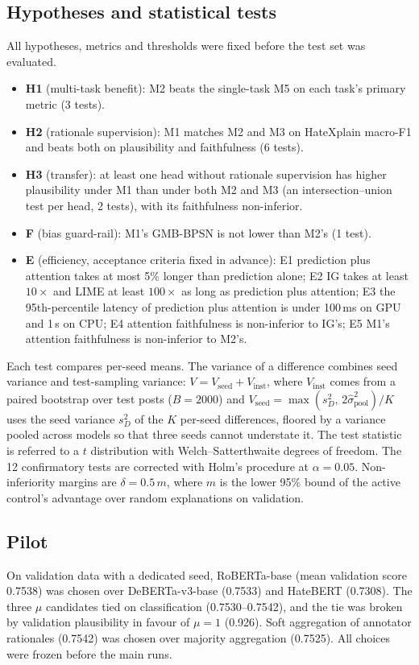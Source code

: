 \documentclass[preprint,12pt,authoryear]{elsarticle}
\begin{document}
\subsection{Hypotheses and statistical tests}
All hypotheses, metrics and thresholds were fixed before the test set was evaluated.
\begin{itemize}
\item \textbf{H1} (multi-task benefit): M2 beats the single-task M5 on each task's primary metric (3 tests).
\item \textbf{H2} (rationale supervision): M1 matches M2 and M3 on HateXplain macro-F1 and beats both on plausibility and faithfulness (6 tests).
\item \textbf{H3} (transfer): at least one head without rationale supervision has higher plausibility under M1 than under both M2 and M3 (an intersection--union test per head, 2 tests), with its faithfulness non-inferior.
\item \textbf{F} (bias guard-rail): M1's GMB-BPSN is not lower than M2's (1 test).
\item \textbf{E} (efficiency, acceptance criteria fixed in advance): E1 prediction plus attention takes at most 5\% longer than prediction alone; E2 IG takes at least $10\times$ and LIME at least $100\times$ as long as prediction plus attention; E3 the 95th-percentile latency of prediction plus attention is under 100\,ms on GPU and 1\,s on CPU; E4 attention faithfulness is non-inferior to IG's; E5 M1's attention faithfulness is non-inferior to M2's.
\end{itemize}
Each test compares per-seed means. The variance of a difference combines seed variance and test-sampling variance: $V = V_{\text{seed}} + V_{\text{inst}}$, where $V_{\text{inst}}$ comes from a paired bootstrap over test posts ($B=2000$) and $V_{\text{seed}} = \max(s_D^2,\,2\hat\sigma^2_{\text{pool}})/K$ uses the seed variance $s_D^2$ of the $K$ per-seed differences, floored by a variance pooled across models so that three seeds cannot understate it. The test statistic is referred to a $t$ distribution with Welch--Satterthwaite degrees of freedom. The 12 confirmatory tests are corrected with Holm's procedure \citep{holm1979simple} at $\alpha=0.05$. Non-inferiority margins are $\delta = 0.5\,m$, where $m$ is the lower 95\% bound of the active control's advantage over random explanations on validation.

\subsection{Pilot}
\label{sec:pilot}
On validation data with a dedicated seed, RoBERTa-base (mean validation score 0.7538) was chosen over DeBERTa-v3-base (0.7533) and HateBERT (0.7308). The three $\mu$ candidates tied on classification (0.7530--0.7542), and the tie was broken by validation plausibility in favour of $\mu=1$ (0.926). Soft aggregation of annotator rationales (0.7542) was chosen over majority aggregation (0.7525). All choices were frozen before the main runs.
\end{document}
